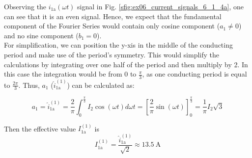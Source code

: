     \begin{solutionblock}
        
    \end{solutionblock}
    \begin{solutionblock}
        Observing the $i_\mathrm{1a}(\omega t)$ signal in Fig. \ref{sfig:ex06_current_signals_6_1_4a}, one can see that it is an even signal. Hence, we expect that the fundamental component of the Fourier Series
        would contain only cosine component ($a_1 \neq 0$) and no sine component ($b_1 = 0$). 
        \\
        For simplification, we can position the y-xis in the middle of the conducting period and make use of the period's symmetry. This would simplify the calculations
        by integrating over one half of the period and then multiply by 2. In this case the integration would be from 0 to $\frac{\pi}{3}$, as one conducting
        period is equal to $\frac{2\pi}{3}$. Thus, $a_1$ ($\hat{i}^\mathrm{(1)}_\mathrm{1a}$) can be calculated as:

        \begin{equation}
            a_1 = \hat{i}^\mathrm{(1)}_\mathrm{1a} = \frac{2}{\pi}\int_{0}^{\frac{\pi}{3}}I_\mathrm{2}\cos(\omega t) d\omega t = \left[\frac{2}{\pi} \sin(\omega t)\right]^{\frac{\pi}{3}}_{0} = \frac{1}{\pi}I_\mathrm{2}\sqrt{3}
            \label{sub6.1.4:eq:calculate_a1}
        \end{equation}  
        
        Then the effective value $I^\mathrm{(1)}_\mathrm{1a}$ is
            \begin{equation}
                I^\mathrm{(1)}_\mathrm{1a} = \frac{\hat{i}^\mathrm{(1)}_\mathrm{1a}}{\sqrt{2}} \approx \SI{13.5}{\ampere}
                \label{sub6.1.4:eq:calculate_I_rms}
            \end{equation}   
        

\end{solutionblock}
